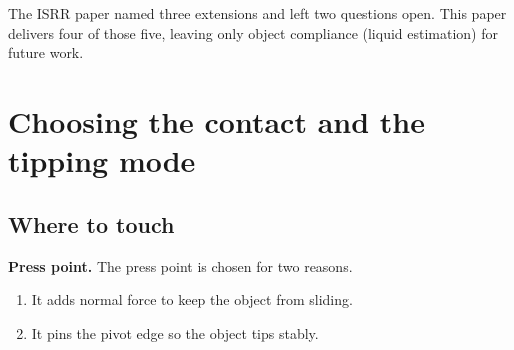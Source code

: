 \documentclass[10pt, conference]{IEEEtran}
\begin{document}
The ISRR paper named three extensions and left two questions open. This paper delivers four of those five, leaving only object compliance (liquid estimation) for future work.

\section{Choosing the contact and the tipping mode}

\subsection{Where to touch}

\noindent\textbf{Press point.} The press point is chosen for two reasons.
\begin{enumerate}[leftmargin=*, itemsep=2pt]
  \item It adds normal force to keep the object from sliding.
  \item It pins the pivot edge so the object tips stably.
\end{enumerate}
\end{document}
